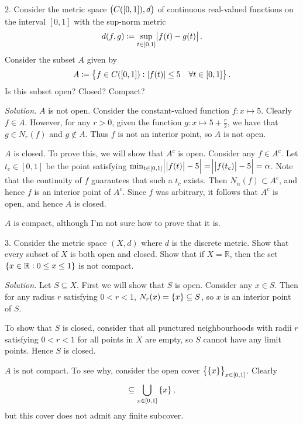 \documentclass{article}
\newcommand{\R}{\mathbb{R}}
\begin{document}
\newpage

2. Consider the metric space $\del{C([0, 1]), d}$ of continuous real-valued
   functions on the interval $[0, 1]$ with the sup-norm metric
%
\begin{equation*}
    d(f, g) \coloneqq \sup_{t \in [0, 1]} \envert{f(t) - g(t)}
    .
\end{equation*}
%
Consider the subset $A$ given by
%
\begin{equation*}
    A \coloneqq \cbr{f \in C([0, 1]): |f(t)| \leq 5 \quad \forall t \in [0, 1]}
    .
\end{equation*}
%
Is this subset open? Closed? Compact?

\textit{Solution.}
$A$ is not open. Consider the constant-valued function $f: x \mapsto 5$.
Clearly $f \in A$. However, for any $r > 0$, given the function $g: x
\mapsto 5 + \frac{r}{2}$, we have that $g \in N_r(f)$ and $g \not\in A$.
Thus $f$ is not an interior point, so $A$ is not open.

$A$ is closed. To prove this, we will show that $A^c$ is open. Consider
any $f \in A^c$. Let $t_c \in [0, 1]$ be the point satisfying $\min_{t
\in [0, 1]} \envert{\,\envert{f(t)} - 5} = \envert{\,\envert{f(t_c)} -
5} = \alpha$. Note that the continuity of $f$ guarantees that such a
$t_c$ exists. Then $N_\alpha (f) \subset A^c$, and hence $f$ is an
interior point of $A^c$. Since $f$ was arbitrary, it follows that $A^c$
is open, and hence $A$ is closed.

$A$ is compact, although I'm not sure how to prove that it is.

\newpage

3. Consider the metric space $(X, d)$ where $d$ is the discrete metric.
   Show that every subset of $X$ is both open and closed. Show that if
   $X = \R$, then the set $\cbr{x \in \R: 0 \leq x \leq 1}$ is not
   compact.

\textit{Solution.}
Let $S \subseteq X$. First we will show that $S$ is open. Consider any
$x \in S$. Then for any radius $r$ satisfying $0 < r < 1$, $N_r(x) =
\cbr{x} \subseteq S$, so $x$ is an interior point of $S$.

To show that $S$ is closed, consider that all punctured neighbourhoods
with radii $r$ satisfying $0 < r < 1$ for all points in $X$ are empty,
so $S$ cannot have any limit points. Hence $S$ is closed.

$A$ is not compact. To see why, consider the open cover
$\cbr{\cbr{x}}_{x \in [0, 1]}$. Clearly
%
\begin{equation*}
    [0, 1] \subseteq \bigcup_{x \in [0, 1]} \cbr{x}
    ,
\end{equation*}
%
but this cover does not admit any finite subcover.
\end{document}
